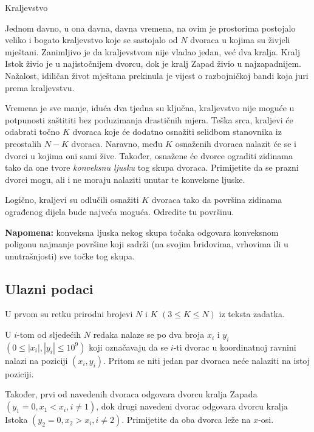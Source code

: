 \begin{statement}[
  problempoints=100,
  timelimit=1 sekunda,
  memorylimit=512 MiB,
]{Kraljevstvo}

Jednom davno, u ona davna, davna vremena, na ovim je prostorima postojalo
veliko i bogato kraljevstvo koje se sastojalo od $N$ dvoraca u kojima su živjeli
mještani. Zanimljivo je da kraljevstvom nije vladao jedan, već dva kralja.
Kralj Istok živio je u najistočnijem dvorcu, dok je kralj Zapad živio u
najzapadnijem. Nažalost, idiličan život mještana prekinula je vijest o
razbojničkoj bandi koja juri prema kraljevstvu.

Vremena je sve manje, iduća dva tjedna su ključna, kraljevstvo nije moguće u
potpunosti zaštititi bez poduzimanja drastičnih mjera. Teška srca, kraljevi
će odabrati točno $K$ dvoraca koje će dodatno osnažiti selidbom stanovnika iz
preostalih $N - K$ dvoraca. Naravno, među $K$ osnaženih dvoraca nalazit će se
i dvorci u kojima oni sami žive.  Također, osnažene će dvorce ograditi
zidinama tako da one tvore \textit{konveksnu ljusku} tog skupa dvoraca.
Primijetite da se prazni dvorci mogu, ali i ne moraju nalaziti unutar te
konveksne ljuske.

Logično, kraljevi su odlučili osnažiti $K$ dvoraca tako da površina zidinama
ograđenog dijela bude najveća moguća. Odredite tu površinu.

\textbf{Napomena:} konveksna ljuska nekog skupa točaka odgovara konveksnom
poligonu najmanje površine koji sadrži (na svojim bridovima, vrhovima ili
u unutrašnjosti) sve točke tog skupa.

\subsection*{Ulazni podaci}
U prvom su retku prirodni brojevi $N$ i $K$ $(3 \le K \le N)$ iz teksta zadatka.

U $i$-tom od sljedećih $N$ redaka nalaze se po dva broja $x_i$ i $y_i$ $(0 \leq
|x_i|, |y_i| \leq 10^9)$ koji označavaju da se $i$-ti dvorac u koordinatnoj
ravnini nalazi na poziciji $(x_i, y_i)$. Pritom se niti jedan par dvoraca neće
nalaziti na istoj poziciji.

Također, prvi od navedenih dvoraca odgovara dvorcu kralja Zapada $(y_1 = 0, x_1
< x_i, i \ne 1)$, dok drugi navedeni dvorac odgovara dvorcu kralja Istoka
$(y_2 = 0, x_2 > x_i, i \ne 2)$. Primijetite da oba dvorca leže na $x$-osi.


\end{statement}
